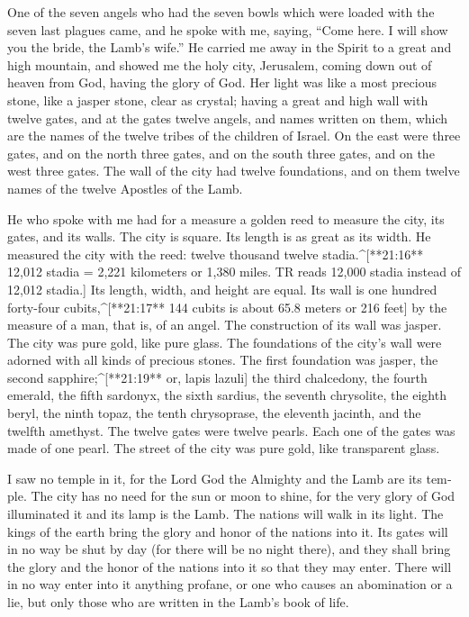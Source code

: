 \begin{paracols}{2}
\begin{english}
 One of the seven angels who had the seven bowls which were loaded with the seven last plagues came, and he spoke with me, saying, “Come here. I will show you the bride, the Lamb’s wife.”  He carried me away in the Spirit to a great and high mountain, and showed me the holy city, Jerusalem, coming down out of heaven from God,  having the glory of God. Her light was like a most precious stone, like a jasper stone, clear as crystal;  having a great and high wall with twelve gates, and at the gates twelve angels, and names written on them, which are the names of the twelve tribes of the children of Israel.  On the east were three gates, and on the north three gates, and on the south three gates, and on the west three gates.  The wall of the city had twelve foundations, and on them twelve names of the twelve Apostles of the Lamb. 

 He who spoke with me had for a measure a golden reed to measure the city, its gates, and its walls.  The city is square. Its length is as great as its width. He measured the city with the reed: twelve thousand twelve stadia.^[**21:16** 12,012 stadia = 2,221 kilometers or 1,380 miles. TR reads 12,000 stadia instead of 12,012 stadia.] Its length, width, and height are equal.  Its wall is one hundred forty-four cubits,^[**21:17** 144 cubits is about 65.8 meters or 216 feet] by the measure of a man, that is, of an angel.  The construction of its wall was jasper. The city was pure gold, like pure glass.  The foundations of the city’s wall were adorned with all kinds of precious stones. The first foundation was jasper, the second sapphire;^[**21:19** or, lapis lazuli] the third chalcedony, the fourth emerald,  the fifth sardonyx, the sixth sardius, the seventh chrysolite, the eighth beryl, the ninth topaz, the tenth chrysoprase, the eleventh jacinth, and the twelfth amethyst.  The twelve gates were twelve pearls. Each one of the gates was made of one pearl. The street of the city was pure gold, like transparent glass. 

 I saw no temple in it, for the Lord God the Almighty and the Lamb are its temple.  The city has no need for the sun or moon to shine, for the very glory of God illuminated it and its lamp is the Lamb.  The nations will walk in its light. The kings of the earth bring the glory and honor of the nations into it.  Its gates will in no way be shut by day (for there will be no night there),  and they shall bring the glory and the honor of the nations into it so that they may enter.  There will in no way enter into it anything profane, or one who causes an abomination or a lie, but only those who are written in the Lamb’s book of life. 


\end{english}
\end{paracols}
